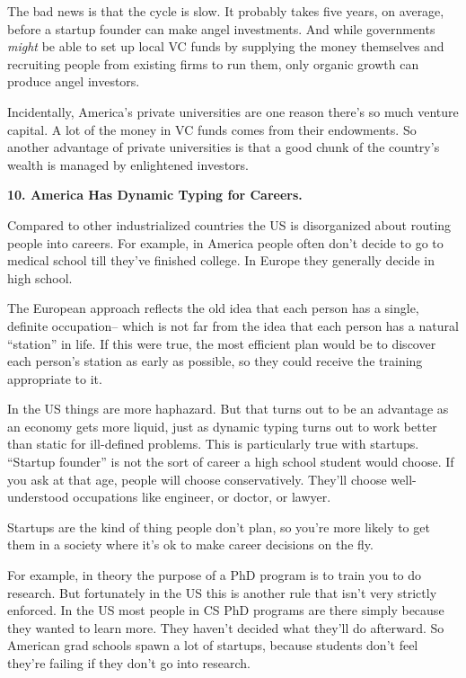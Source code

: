 The bad news is that the cycle is slow. It probably takes five years, on
average, before a startup founder can make angel investments. And while
governments \emph{might} be able to set up local VC funds by supplying
the money themselves and recruiting people from existing firms to run
them, only organic growth can produce angel investors.

Incidentally, America's private universities are one reason there's so
much venture capital. A lot of the money in VC funds comes from their
endowments. So another advantage of private universities is that a good
chunk of the country's wealth is managed by enlightened investors.

\textbf{10. America Has Dynamic Typing for Careers.}

Compared to other industrialized countries the US is disorganized about
routing people into careers. For example, in America people often don't
decide to go to medical school till they've finished college. In Europe
they generally decide in high school.

The European approach reflects the old idea that each person has a
single, definite occupation-- which is not far from the idea that each
person has a natural ``station'' in life. If this were true, the most
efficient plan would be to discover each person's station as early as
possible, so they could receive the training appropriate to it.

In the US things are more haphazard. But that turns out to be an
advantage as an economy gets more liquid, just as dynamic typing turns
out to work better than static for ill-defined problems. This is
particularly true with startups. ``Startup founder'' is not the sort of
career a high school student would choose. If you ask at that age,
people will choose conservatively. They'll choose well-understood
occupations like engineer, or doctor, or lawyer.

Startups are the kind of thing people don't plan, so you're more likely
to get them in a society where it's ok to make career decisions on the
fly.

For example, in theory the purpose of a PhD program is to train you to
do research. But fortunately in the US this is another rule that isn't
very strictly enforced. In the US most people in CS PhD programs are
there simply because they wanted to learn more. They haven't decided
what they'll do afterward. So American grad schools spawn a lot of
startups, because students don't feel they're failing if they don't go
into research.

